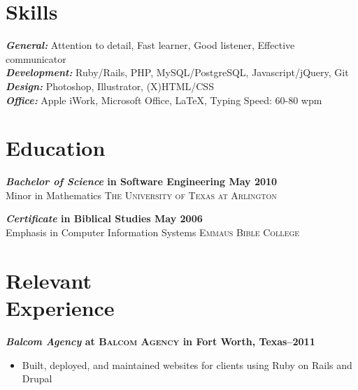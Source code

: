 \documentclass[margin]{res}
\newcommand{\sectionspace}{\vspace{8pt}}
\begin{document}
\begin{resume}

\section{\textsf{Skills}}

              
                \textbf{\textit{General:}} Attention to detail, Fast learner, Good listener, Effective communicator  \\
                \textbf{\textit{Development:}} Ruby/Rails, PHP, MySQL/PostgreSQL, Javascript/jQuery, Git  \\
                \textbf{\textit{Design:}} Photoshop, Illustrator, (X)HTML/CSS  \\
                \textbf{\textit{Office:}} Apple iWork, Microsoft Office, \LaTeX, Typing Speed: 60-80 wpm  \\
\sectionspace

\section{\textsf{Education}}
              
                \textbf{\textit{Bachelor of Science} in Software Engineering \dotfill May 2010 }  \\
                Minor in Mathematics \hfill  \textsc{The University of Texas at Arlington}
              
                \textbf{\textit{Certificate} in Biblical Studies \dotfill May 2006 }  \\
                Emphasis in Computer Information Systems \hfill  \textsc{Emmaus Bible College}
              
\sectionspace


\section{\textsf{Relevant \\ Experience}}

              
                \textbf{\textit{Balcom Agency}
                 at \textsc{Balcom Agency} in Fort Worth, Texas--2011}
                 \vspace{-10pt}\begin{itemize} \itemsep -2pt %
                   \item Built, deployed, and maintained websites for clients using Ruby on Rails and Drupal
                 

\end{itemize}
\end{resume}
\end{document}
